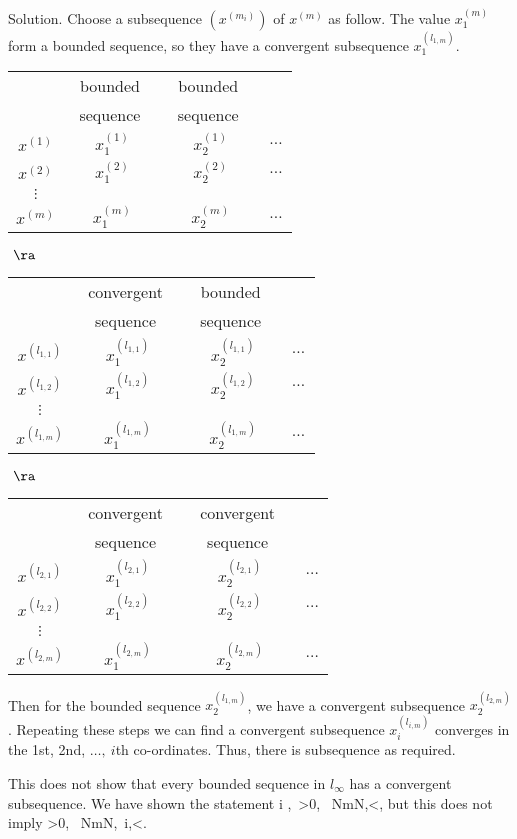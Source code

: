 Solution. Choose a subsequence $(x^{(m_i)})$ of $x^{(m)}$ as follow. The value $x_1^{(m)}$ form a bounded sequence, so they have a convergent subsequence $x_1^{(l_{1,m})}$. 
\begin{center}
\begin{tabular}{c|ccc}
 & \ bounded \  & \ bounded \  &  \\ 
 & \ sequence \  & \ sequence \  & $\quad$ \\ \hline
$x^{(1)}$ & $x_1^{(1)}$ & $x_2^{(1)}$ & $\dots$  \\ 
$x^{(2)}$ & $x_1^{(2)}$ & $x_2^{(2)}$ & $\dots$  \\ 
$\vdots$ & & &\\
$x^{(m)}$ & $x_1^{(m)}$ & $x_2^{(m)}$ & $\dots$  
\end{tabular} $\ \ra \ $
\begin{tabular}{c|ccc}
 & \ convergent \  & \ bounded \  &  \\ 
 & \ sequence \  & \ sequence \  & $\quad$ \\ \hline
$x^{(l_{1,1})}$ & $x_1^{(l_{1,1})}$ & $x_2^{(l_{1,1})}$ & $\dots$  \\ 
$x^{(l_{1,2})}$ & $x_1^{(l_{1,2})}$ & $x_2^{(l_{1,2})}$ & $\dots$  \\ 
$\vdots$ & & & \\
$x^{(l_{1,m})}$ & $x_1^{(l_{1,m})}$ & $x_2^{(l_{1,m})}$ & $\dots$  
\end{tabular} $\  \ra \ $
\begin{tabular}{c|ccc}
 & \ convergent \  & \ convergent \  &  \\ 
 & \ sequence \  & \ sequence \  & $\quad$ \\ \hline
$x^{(l_{2,1})}$ & $x_1^{(l_{2,1})}$ & $x_2^{(l_{2,1})}$ & $\dots$  \\ 
$x^{(l_{2,2})}$ & $x_1^{(l_{2,2})}$ & $x_2^{(l_{2,2})}$ & $\dots$  \\ 
$\vdots$ & & & \\
$x^{(l_{2,m})}$ & $x_1^{(l_{2,m})}$ & $x_2^{(l_{2,m})}$ & $\dots$  
\end{tabular}
\end{center}
Then for the bounded sequence $x_2^{(l_{1,m})}$, we have a convergent subsequence $x_2^{(l_{2,m})}$. Repeating these steps we can find a convergent subsequence $x_i^{(l_{i,m})}$ converges in the 1st, 2nd, $\dots,\ i$th co-ordinates. Thus, there is subsequence as required. 

This does not show that every bounded sequence in $l_{\infty}$ has a convergent subsequence. We have shown the statement
\be
\forall i \in \N,\ \forall \ve>0, \ \exists N\in\N {}\forall m\geq N,\quad {}<\ve,
\ee
but this does not imply
\be
\forall \ve >0, \ \exists N\in\N {}\forall m\geq N,\ \forall i\in \N,\quad {}<\ve.
\ee

